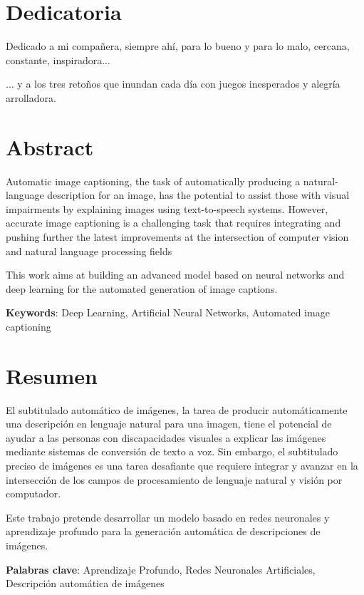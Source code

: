 \chapter*{Dedicatoria}

Dedicado a mi compañera, siempre ahí, para lo bueno y para lo malo, cercana, constante, inspiradora...

... y a los tres retoños que inundan cada día con juegos inesperados y alegría arrolladora.



\chapter*{Abstract}

\onehalfspacing

Automatic image captioning, the task of automatically producing a natural-language description for an image, has the potential to assist those with visual impairments by explaining images using text-to-speech systems. However, accurate image captioning is a challenging task that requires integrating and pushing further the latest improvements at the intersection of computer vision and natural language processing fields

This work aims at building an advanced model based on neural networks and deep learning for the automated generation of image captions. 


\vspace{1.5cm}

\textbf{Keywords}: Deep Learning, Artificial Neural Networks, Automated image captioning


\chapter*{Resumen}

\onehalfspacing

El subtitulado automático de imágenes, la tarea de producir automáticamente una descripción en lenguaje natural para una imagen, tiene el potencial de ayudar a las personas con discapacidades visuales a explicar las imágenes mediante sistemas de conversión de texto a voz. Sin embargo, el subtitulado preciso de imágenes es una tarea desafiante que requiere integrar y avanzar en la intersección de los campos de procesamiento de lenguaje natural y visión por computador.

Este trabajo pretende desarrollar un modelo basado en redes neuronales y aprendizaje profundo para la generación automática de descripciones de imágenes.


\vspace{1.5cm}

\textbf{Palabras clave}: Aprendizaje Profundo, Redes Neuronales Artificiales, Descripción automática de imágenes